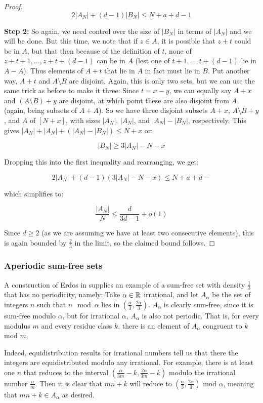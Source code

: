 \documentclass{article}
\theoremstyle{definition}
\theoremstyle{remark}
\numberwithin{equation}{section}
\begin{document}
\begin{proof}
\[2|A_N|+(d-1)|B_N| \leq N+a+d-1\]

\textbf{Step 2: }So again, we need control over the size of $|B_N|$ in
terms of $|A_N|$ and we will be done.  But this time, we note that if
$z \in A$, it is possible that $z+t$ could be in $A$, but that then
because of the definition of $t$, none of $z+t+1, \ldots, z+t+(d-1)$
can be in $A$ (lest one of $t+1, \ldots, t+(d-1)$ lie in $A-A$).  Thus
elements of $A+t$ that lie in $A$ in fact must lie in $B$.  Put another
way, $A+t$ and $A \setminus B$ are disjoint.  Again, this is only two
sets, but we can use the same trick as before to make it three: Since
$t = x-y$, we can equally say $A+x$ and $(A \setminus B) + y$ are
disjoint, at which point these are also disjoint from $A$ (again,
being subsets of $A+A$).  So we have three disjoint subsets $A+x$,
$A \setminus B + y$, and $A$ of $[N+x]$, with sizes $|A_N|$, $|A_N|$,
and $|A_N|-|B_N|$, respectively.  This gives
$|A_N| + |A_N| + (|A_N| - |B_N|) \leq N+x$ or:

\[|B_N| \geq 3|A_N|-N-x\]

Dropping this into the first inequality and rearranging, we get:

\[2|A_N|+(d-1)(3|A_N|-N-x) \leq N+a+d-\]

which simplifies to: 

\[\frac{|A_N|}{N} \leq \frac{d}{3d-1} + o(1)\]

Since $d \geq 2$ (as we are assuming we have at least two consecutive
elements), this is again bounded by $\frac25$ in the limit, so the
claimed bound follows.
\end{proof}

\subsubsection{Aperiodic sum-free sets}

A construction of Erdos in \cite{erdos:spm1965} supplies an
example of a sum-free set with density $\frac13$ that has no
periodicity, namely: Take $\alpha \in \mathbb{R}$ irrational, and let
$A_\alpha$ be the set of integers $n$ such that $n \mod{\alpha}$ lies
in $\left(\frac \alpha 3, \frac {2\alpha}{3}\right)$.  $A_\alpha$ is
clearly sum-free, since it is sum-free modulo $\alpha$, but for
irrational $\alpha$, $A_\alpha$ is also not periodic.  That is, for
every modulus $m$ and every residue class $k$, there is an element of
$A_\alpha$ congruent to $k$ mod $m$.  

Indeed, equidistribution results for irrational numbers tell us that
there the integers are equidistributed modulo any irrational.  For
example, there is at least one $n$ that reduces to the interval
$\left(\frac{\alpha}{3m}-k,\frac{2\alpha}{3m}-k\right)$ modulo the
irrational number $\frac{\alpha}{m}$.  Then it is clear that $mn+k$
will reduce to $\left(\frac{\alpha}{3},\frac{2\alpha}{3}\right)$ mod
$\alpha$, meaning that $mn+k \in A_\alpha$ as desired.
\end{document}
